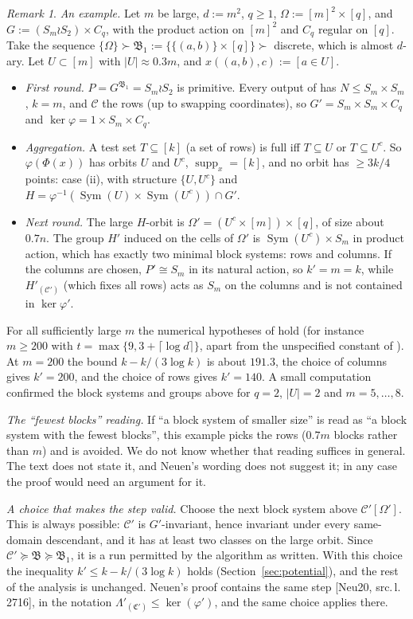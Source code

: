 \documentclass[11pt]{article}
\theoremstyle{plain}
\theoremstyle{definition}
\theoremstyle{remark}
\newtheorem{remark}[theorem]{Remark}
\theoremstyle{named}
\theoremstyle{namedrm}
\newcommand{\Sym}{\operatorname{Sym}}
\newcommand{\supp}{\operatorname{supp}}
\newcommand{\fB}{\mathfrak{B}}
\newcommand{\cC}{\mathcal{C}}
\newcommand{\Cp}{\mathcal{C}'}
\newcommand{\src}[2]{[#1, src.\,l.\,#2]}
\begin{document}
\begin{remark}
\emph{An example.} Let $m$ be large, $d:=m^2$, $q\ge1$, $\Omega:=[m]^2\times[q]$, and
$G:=(S_m\wr S_2)\times C_q$, with the product action on $[m]^2$ and $C_q$ regular on $[q]$. Take the
sequence $\{\Omega\}\succ\fB_1:=\{\{(a,b)\}\times[q]\}\succ$ discrete, which is almost $d$-ary. Let $U\subset[m]$
with $|U|\approx0.3m$, and $x((a,b),c):=[a\in U]$.
\begin{itemize}
\item \emph{First round.} $P=G^{\fB_1}=S_m\wr S_2$ is primitive. Every output of \cite[Lemma~7.1]{GNS} has
  $N\le S_m\times S_m$, $k=m$, and $\cC$ the rows (up to swapping coordinates), so $G'=S_m\times S_m\times C_q$ and
  $\ker\varphi=1\times S_m\times C_q$.
\item \emph{Aggregation.} A test set $T\subseteq[k]$ (a set of rows) is full iff $T\subseteq U$ or
  $T\subseteq U^c$. So $\varphi(\Phi(x))$ has orbits $U$ and $U^c$, $\supp_x=[k]$, and no orbit has $\ge3k/4$ points:
  case (ii), with structure $\{U,U^c\}$ and $H=\varphi^{-1}(\Sym(U)\times\Sym(U^c))\cap G'$.
\item \emph{Next round.} The large $H$-orbit is $\Omega'=(U^c\times[m])\times[q]$, of size about $0.7n$. The
  group $H'$ induced on the cells of $\Omega'$ is $\Sym(U^c)\times S_m$ in product action, which has exactly two
  minimal block systems: rows and columns. If the columns are chosen, $P'\cong S_m$ in its natural action,
  so $k'=m=k$, while $H'_{(\Cp)}$ (which fixes all rows) acts as $S_m$ on the columns and is not contained in
  $\ker\varphi'$.
\end{itemize}
For all sufficiently large $m$ the numerical hypotheses of \cite[Lemma~7.2]{GNS} hold (for instance
$m\ge200$ with $t=\max\{9,3+\lceil\log d\rceil\}$, apart from the unspecified constant of
\cite[Lemma~7.1]{GNS}). At $m=200$ the bound $k-k/(3\log k)$ is about $191.3$, the choice of columns gives
$k'=200$, and the choice of rows gives $k'=140$. A small computation confirmed the block systems and
groups above for $q=2$, $|U|=2$ and $m=5,\dots,8$.

\emph{The ``fewest blocks'' reading.} If ``a block system of smaller size'' is read as ``a block system with
the fewest blocks'', this example picks the rows ($0.7m$ blocks rather than $m$) and is avoided. We do not
know whether that reading suffices in general. The text does not state it, and Neuen's wording does not
suggest it; in any case the proof would need an argument for it.

\emph{A choice that makes the step valid.} Choose the next block system above $\Cp[\Omega']$. This is
always possible: $\Cp$ is $G'$-invariant, hence invariant under every same-domain descendant, and it has at
least two classes on the large orbit. Since $\Cp\succeq\fB\succeq\fB_1$, it is a run permitted by the algorithm
as written. With this choice the inequality $k'\le k-k/(3\log k)$ holds (Section~\ref{sec:potential}), and
the rest of the analysis is unchanged. Neuen's proof \cite[Lemma~4.36]{Neu20} contains the same step
\src{Neu20}{2716}, in the notation $\Lambda'_{(\mathfrak C')}\le\ker(\varphi')$, and the same choice applies there.


\end{remark}
\end{document}

